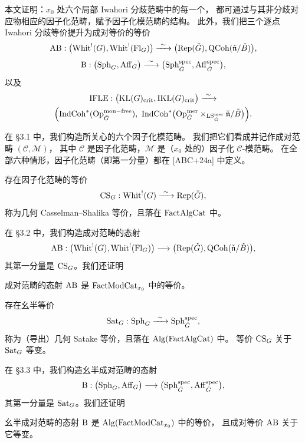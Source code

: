 本文证明：$x_0$ 处六个局部 Iwahori 分歧范畴中的每一个，
都可通过与其非分歧对应物相应的因子化范畴，赋予因子化模范畴的结构。
此外，我们把三个逐点 Iwahori 分歧等价提升为成对等价的等价
\[
\AB:\bigl(\Whit^{!}(G),\Whit^{!}(\Fl_G)\bigr)\xrightarrow{\ \sim\ }
\bigl(\Rep(\Gd),\QCoh(\nd/\Bd)\bigr),
\]
\[
\B:\bigl(\Sph_G,\Aff_G\bigr)\xrightarrow{\ \sim\ }
\bigl(\Sph^{\spec}_{\Gd},\Aff^{\spec}_{\Gd}\bigr),
\]
以及
\begin{multline*}
\IFLE:\bigl(\KL(G)_{\mathrm{crit}},\IKL(G)_{\mathrm{crit}}\bigr)\xrightarrow{\ \sim\ }\\
\Bigl(\IndCoh^{*}(\Op^{\monfree}_{\Gd}),\
\IndCoh^{*}\bigl(\Op^{\mer}_{\Gd}\times_{\LS^{\mer}_{\Gd}}\nd/\Bd\bigr)\Bigr).
\end{multline*}

在 §3.1 中，我们构造所关心的六个因子化模范畴。
我们把它们看成并记作成对范畴 $(\mathcal{C},\mathcal{M})$，
其中 $\mathcal{C}$ 是因子化范畴，$\mathcal{M}$ 是（$x_0$ 处的）因子化 $\mathcal{C}$-模范畴。
在全部六种情形，因子化范畴（即第一分量）都在 [ABC+24a] 中定义。

\begin{proposition}[\textup{[ABC+24a]}]
\label{prop:1.1.2.1}
存在因子化范畴的等价
\[
\CS_G:\Whit^{!}(G)\xrightarrow{\ \sim\ }\Rep(\Gd),
\]
称为几何 Casselman–Shalika 等价，且落在 $\mathrm{FactAlgCat}$ 中。
\end{proposition}

在 §3.2 中，我们构造成对范畴的态射
\[
\mathrm{AB}:\bigl(\mathrm{Whit}^{!}(G),\mathrm{Whit}^{!}(\mathrm{Fl}_G)\bigr)\longrightarrow
\bigl(\mathrm{Rep}(\check{G}),\mathrm{QCoh}(\check{\mathfrak{n}}/\check{B})\bigr),
\]
其第一分量是 $\mathrm{CS}_G$。我们还证明

\begin{theorem}
\label{thm:1.1.2.2}\label{thm:AB}
成对范畴的态射 $\mathrm{AB}$ 是 $\mathrm{FactModCat}_{x_0}$ 中的等价。
\end{theorem}

\begin{proposition}[\textup{[ABC+24a]}]
\label{prop:1.1.2.3}
存在幺半等价
\[
\Sat_G:\Sph_G\xrightarrow{\ \sim\ }\Sph^{\spec}_{\Gd},
\]
称为（导出）几何 Satake 等价，且落在 $\mathrm{Alg}(\mathrm{FactAlgCat})$ 中。
等价 $\mathrm{CS}_G$ 关于 $\mathrm{Sat}_G$ 等变。
\end{proposition}

在 §3.3 中，我们构造幺半成对范畴的态射
\[
\mathrm{B}:\bigl(\mathrm{Sph}_G,\mathrm{Aff}_G\bigr)\longrightarrow
\bigl(\mathrm{Sph}^{\mathrm{spec}}_{\check{G}},\mathrm{Aff}^{\mathrm{spec}}_{\check{G}}\bigr),
\]
其第一分量是 $\mathrm{Sat}_G$。我们还证明

\begin{theorem}
\label{thm:1.1.2.4}\label{thm:B}
幺半成对范畴的态射 $\mathrm{B}$ 是 $\mathrm{Alg}(\mathrm{FactModCat}_{x_0})$ 中的等价，
且成对等价 $\mathrm{AB}$ 关于它等变。
\end{theorem}

